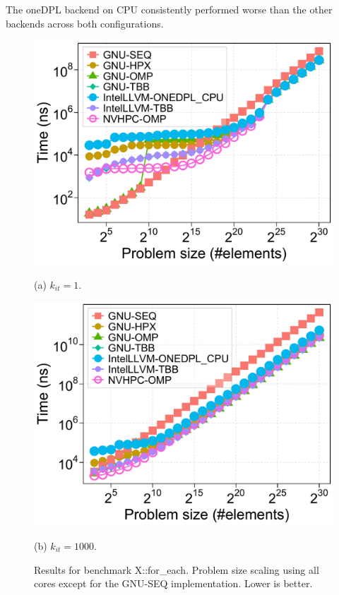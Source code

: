 \documentclass[sigconf]{acmart}
\begin{document}
The oneDPL backend on CPU consistently performed worse than the other backends
across both configurations.

\begin{figure}[H]
      \centering
      \begin{minipage}[t]{0.48\linewidth}
            \centering
            \includegraphics[width=\linewidth]{figures/problemSize_time-for_each-k1}
            \caption*{(a) $k_{it} = 1$.}
      \end{minipage}
      \hfill
      \begin{minipage}[t]{0.48\linewidth}
            \centering
            \includegraphics[width=\linewidth]{figures/problemSize_time-for_each-k1000}
            \caption*{(b) $k_{it} = 1000$.}
      \end{minipage}
      \caption{Results for benchmark X::for\_each. Problem size scaling using all
            cores except for the GNU-SEQ implementation. Lower is better.}
      \label{fig:problemSize_time-for_each}
\end{figure}
\end{document}
